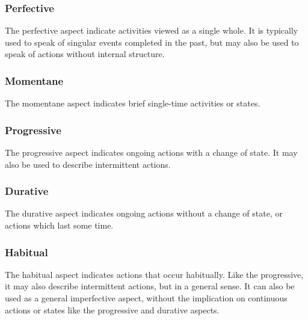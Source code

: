 \documentclass[grammar]{subfiles}
\begin{document}
  \subsubsection{Perfective}
  \label{vm:sssec_perfective}

  The perfective aspect indicate activities viewed as a single whole.
  It is typically used to speak of singular events completed in the past, but
  may also be used to speak of actions without internal structure.


  \subsubsection{Momentane}
  \label{vm:sssec_momentane}

  The momentane aspect indicates brief single-time activities or states.


  \subsubsection{Progressive}
  \label{vm:sssec_progressive}

  The progressive aspect indicates ongoing actions with a change of state.  It
  may also be used to describe intermittent actions.


  \subsubsection{Durative}
  \label{vm:sssec_durative}

  The durative aspect indicates ongoing actions without a change of state, or actions which last some time.


  \subsubsection{Habitual}
  \label{vm:sssec_habitual}

  The habitual aspect indicates actions that occur habitually.  Like the
  progressive, it may also describe intermittent actions, but in a general
  sense.  It can also be used as a general imperfective aspect, without the
  implication on continuous actions or states like the progressive and durative
  aspects. 
\end{document}
